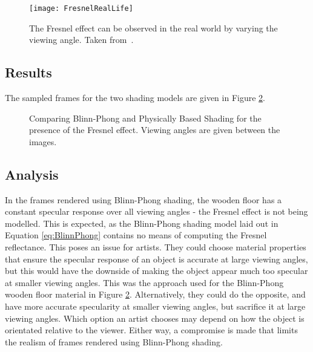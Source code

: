 \begin{figure}[h]
	\centering
	\texttt{[image: FresnelRealLife]}
	\caption{The Fresnel effect can be observed in the real world by varying the viewing angle. Taken from~\cite{MarkusLecture}.}
	\label{fig:FresnelRealLife}
\end{figure}

\vspace{-0.3cm}

\subsection{Results}

The sampled frames for the two shading models are given in Figure \ref{fig:FresnelResults}.

\begin{figure}[h]
	\caption{Comparing Blinn-Phong and Physically Based Shading for the presence of the Fresnel effect. Viewing angles are given between the images.}
	\label{fig:FresnelResults}
\end{figure}

\vspace{-0.3cm}

\subsection{Analysis}

In the frames rendered using Blinn-Phong shading, the wooden floor has a constant specular response over all viewing angles - the Fresnel effect is not being modelled. This is expected, as the Blinn-Phong shading model laid out in Equation \ref{eq:BlinnPhong} contains no means of computing the Fresnel reflectance. This poses an issue for artists. They could choose material properties that ensure the specular response of an object is accurate at large viewing angles, but this would have the downside of making the object appear much too specular at smaller viewing angles. This was the approach used for the Blinn-Phong wooden floor material in Figure \ref{fig:FresnelResults}. Alternatively, they could do the opposite, and have more accurate specularity at smaller viewing angles, but sacrifice it at large viewing angles. Which option an artist chooses may depend on how the object is orientated relative to the viewer. Either way, a compromise is made that limits the realism of frames rendered using Blinn-Phong shading.

